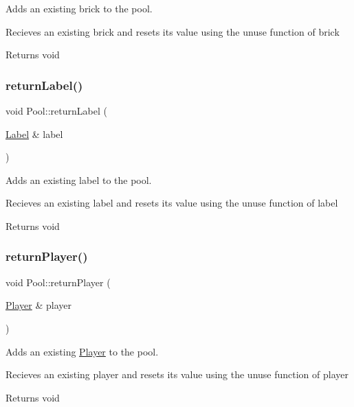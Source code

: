 Adds an existing brick to the pool. 

Recieves an existing brick and resets it\textquotesingle{}s value using the unuse function of brick

\begin{DoxyReturn}{Returns}
void 
\end{DoxyReturn}
\mbox{\label{class_pool_a2a38a2d1aa883152d27fa213ac2cc2e8}} 
\subsubsection{\texorpdfstring{return\+Label()}{returnLabel()}}
{\footnotesize\ttfamily void Pool\+::return\+Label (\begin{DoxyParamCaption}\item[{\hyperlink{class_label}{Label} \&}]{label }\end{DoxyParamCaption})}



Adds an existing label to the pool. 

Recieves an existing label and resets it\textquotesingle{}s value using the unuse function of label

\begin{DoxyReturn}{Returns}
void 
\end{DoxyReturn}
\mbox{\label{class_pool_a3e6ed735e15ad548db48a0cefbb5b821}} 
\subsubsection{\texorpdfstring{return\+Player()}{returnPlayer()}}
{\footnotesize\ttfamily void Pool\+::return\+Player (\begin{DoxyParamCaption}\item[{\hyperlink{class_player}{Player} \&}]{player }\end{DoxyParamCaption})}



Adds an existing \hyperlink{class_player}{Player} to the pool. 

Recieves an existing player and resets it\textquotesingle{}s value using the unuse function of player

\begin{DoxyReturn}{Returns}
void 
\end{DoxyReturn}
\mbox{\label{class_pool_a3b5250c08babf163d9d4877c7a2a6f40}} 
